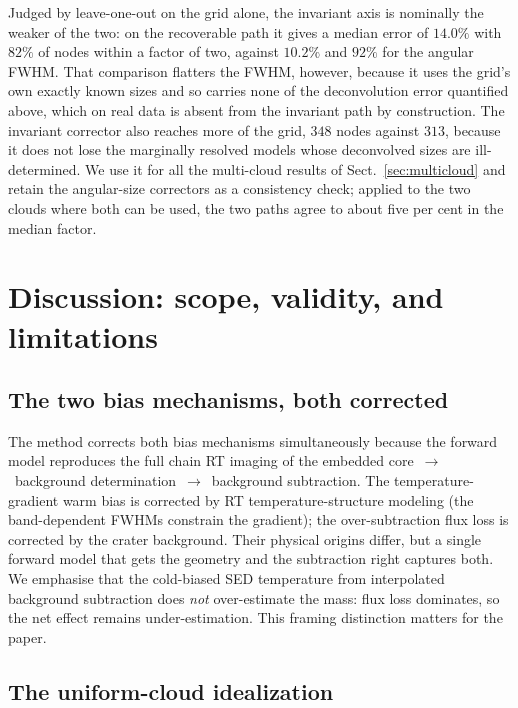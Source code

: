 \documentclass[11pt,a4paper]{article}
\begin{document}
Judged by leave-one-out on the grid alone, the invariant axis is nominally the
weaker of the two: on the recoverable path it gives a median error of $14.0\%$
with $82\%$ of nodes within a factor of two, against $10.2\%$ and $92\%$ for the
angular FWHM. That comparison flatters the FWHM, however, because it uses the
grid's own exactly known sizes and so carries none of the deconvolution error
quantified above, which on real data is absent from the invariant path by
construction. The invariant corrector also reaches more of the grid, $348$
nodes against $313$, because it does not lose the marginally resolved models
whose deconvolved sizes are ill-determined. We use it for all the multi-cloud
results of Sect.~\ref{sec:multicloud} and retain the angular-size correctors as
a consistency check; applied to the two clouds where both can be used, the two
paths agree to about five per cent in the median factor.

\section{Discussion: scope, validity, and limitations}

\subsection{The two bias mechanisms, both corrected}

The method corrects both bias mechanisms simultaneously because the forward
model reproduces the full chain
RT imaging of the embedded core~$\rightarrow$~background
determination~$\rightarrow$~background subtraction.
The temperature-gradient warm bias is corrected by RT temperature-structure
modeling (the band-dependent FWHMs constrain the gradient); the
over-subtraction flux loss is corrected by the crater background. Their
physical origins differ, but a single forward model that gets the geometry
and the subtraction right captures both. We emphasise that the cold-biased
SED temperature from interpolated background subtraction does \emph{not}
over-estimate the mass: flux loss dominates, so the net effect remains
under-estimation. This framing distinction matters for the paper.

\subsection{The uniform-cloud idealization}
\label{sec:uniformcloud}
\end{document}

